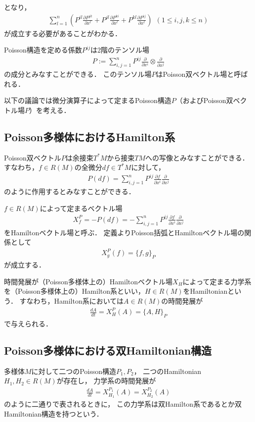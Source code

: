 \documentclass[dvipdfmx,12pt,a4paper,uplatex]{jsarticle}
\theoremstyle{plain}
\theoremstyle{definition}
\begin{document}
となり，
\begin{align}
\sum_{l=1}^n 
\left(
P^{il}\frac{\partial  P^{jk}}{\partial x^l}
+
P^{jl}\frac{\partial  P^{ki}}{\partial x^l}
+
P^{kl}\frac{\partial  P^{ij}}{\partial x^l}
\right) \ \ (1\le i,j,k\le n)
\end{align}
が成立する必要があることがわかる．

Poisson構造を定める係数$P^{ij}$は2階のテンソル場
\begin{align}
P := \sum_{i,j=1}^n P^{ij} \frac{\partial}{\partial x^i} \otimes \frac{\partial}{\partial x^j}
\end{align}
の成分とみなすことができる．
このテンソル場$P$はPoisson双ベクトル場と呼ばれる．

以下の議論では微分演算子によって定まるPoisson構造$P$（およびPoisson双ベクトル場$P$）を考える．
\subsection{Poisson多様体におけるHamilton系}
Poisson双ベクトル$P$は余接束$T^*M$から接束$TM$への写像とみなすことができる．
すなわち，$f\in R(M)$の全微分$df\in T^{*}M$に対して，
\begin{align}
P(df) = \sum_{i,j=1}^n P^{ij} \frac{\partial f}{\partial x^i}  \frac{\partial}{\partial x^j}
\end{align}
のように作用するとみなすことができる．

$f\in R(M)$によって定まるベクトル場
\begin{align}
X^P_f = -P(df) = -\sum_{i,j=1}^n P^{ij} \frac{\partial f}{\partial x^i}  \frac{\partial}{\partial x^j}
\end{align}
をHamiltonベクトル場と呼ぶ．
定義よりPoisson括弧とHamiltonベクトル場の関係として
\begin{align}
X^P_g(f) = \{f,g\}_{P}
\end{align}
が成立する．

時間発展が（Poisson多様体上の）Hamiltonベクトル場$X_H$によって定まる力学系
を（Poisson多様体上の）Hamilton系といい，$H \in R(M)$をHamiltonianという．
すなわち，Hamilton系においては$A\in R(M)$の時間発展が
\begin{align}
\frac{dA}{dt} = X^P_H(A) = \{A,H\}_{P} 
\end{align}
で与えられる．

\subsection{Poisson多様体における双Hamiltonian構造}
多様体$M$に対して二つのPoisson構造$P_1,P_2$，
二つのHamiltonian$H_1,H_2 \in R(M)$が存在し，
力学系の時間発展が
\begin{align}
\frac{dA}{dt} = X^{P_1}_{H_1}(A) = X^{P_2}_{H_2}(A)
\end{align}
のように二通りで表されるときに，
この力学系は双Hamilton系であるとか双Hamiltonian構造を持つという．
\end{document}
